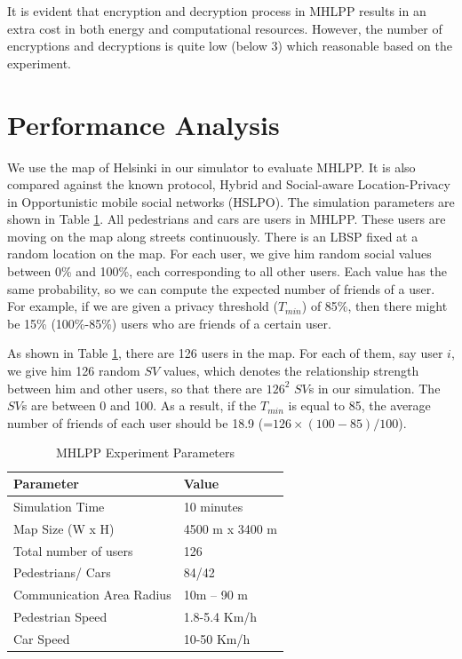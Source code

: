 It is evident that encryption and decryption process in MHLPP results in an extra cost in both energy and computational resources. However, the number of encryptions and decryptions is quite low (below 3) which reasonable based on the experiment.

\section{ Performance Analysis}

\noindent We use the map of Helsinki in our simulator to evaluate MHLPP. It is also compared against the known protocol, Hybrid and Social-aware Location-Privacy in Opportunistic mobile social networks (HSLPO). The simulation parameters are shown in Table \ref{table:MhlppExperimentParameters}. All pedestrians and cars are users in MHLPP. These users are moving on the map along streets continuously. There is an LBSP fixed at a random location on the map. For each user, we give him random social values between 0\% and 100\%, each corresponding to all other users. Each value has the same probability, so we can compute the expected number of friends of a user. For example, if we are given a privacy threshold (${T}_{min}$) of 85\%, then there might be 15\% (100\%-85\%) users who are friends of a certain user.

As shown in Table \ref{table:MhlppExperimentParameters}, there are 126 users in the map. For each of them, say user $i$, we give him 126 random $SV$ values, which denotes the relationship strength between him and other users, so that there are ${126}^2$ $SV$s in our simulation. The $SV$s are between 0 and 100. As a result, if the ${T}_{min}$ is equal to 85, the average number of friends of each user should be 18.9 (=$126\times (100-85)/100$).

\begin{table} [hbtp]
\caption{MHLPP Experiment Parameters}
\label{table:MhlppExperimentParameters}
\centering
\begin{tabular}{|l|l|} \hline 
Parameter & Value \\ \hline 
Simulation Time & 10 minutes \\ \hline 
Map Size (W x H) & 4500 m x 3400 m \\ \hline 
Total number of users & 126 \\ \hline 
Pedestrians/ Cars & 84/42 \\ \hline 
Communication Area Radius & 10m -- 90 m \\ \hline 
Pedestrian Speed & 1.8-5.4 Km/h \\ \hline 
Car Speed & 10-50 Km/h \\ \hline 
\end{tabular}
\end{table}

